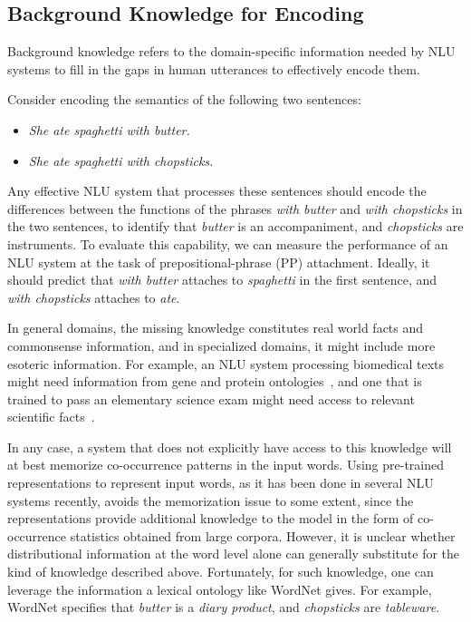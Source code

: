 \subsection{Background Knowledge for Encoding} Background knowledge refers to the domain-specific
information needed by NLU systems to fill in the gaps in human utterances to effectively encode
them.

Consider encoding the semantics of the following two sentences:
\begin{itemize}
	\item[] \textit{She ate spaghetti with butter.}
	\item[] \textit{She ate spaghetti with chopsticks.}
\end{itemize}
Any effective NLU system that processes these sentences should encode the
differences between the functions of the phrases \textit{with butter} and
\textit{with chopsticks} in the two sentences, to identify that \textit{butter}
is an accompaniment, and \textit{chopsticks} are instruments. To evaluate this
capability, we can measure the performance of an NLU system at the task of
prepositional-phrase (PP) attachment. Ideally, it should predict that
\textit{with butter} attaches to \textit{spaghetti} in the first sentence, and
\textit{with chopsticks} attaches to \textit{ate}.

In general domains, the missing knowledge constitutes real world facts and commonsense information, and
in specialized domains, it might include more esoteric information. For example, an NLU system processing
biomedical texts might need information from gene and protein ontologies~\citep{Bodenreider2004TheUM}, and one
that is trained to pass an elementary science exam might need access to relevant scientific
facts~\citep{Clark2013ASO}.

In any case, a system that does not explicitly have access to this knowledge will at best memorize
co-occurrence patterns in the input words.  Using pre-trained representations to represent input words,
as it has been done in several NLU systems recently,
avoids the memorization issue to some extent, since the representations provide additional knowledge to the model
in the form of co-occurrence statistics obtained from
large corpora. However, it is unclear whether distributional information at the word level alone can
generally substitute for the kind of knowledge described above. Fortunately, for such knowledge,
one can leverage the information a lexical ontology like WordNet \citep{miller1995wordnet}
gives. For example, WordNet specifies that \textit{butter} is a \textit{diary product}, and
\textit{chopsticks} are \textit{tableware}.

